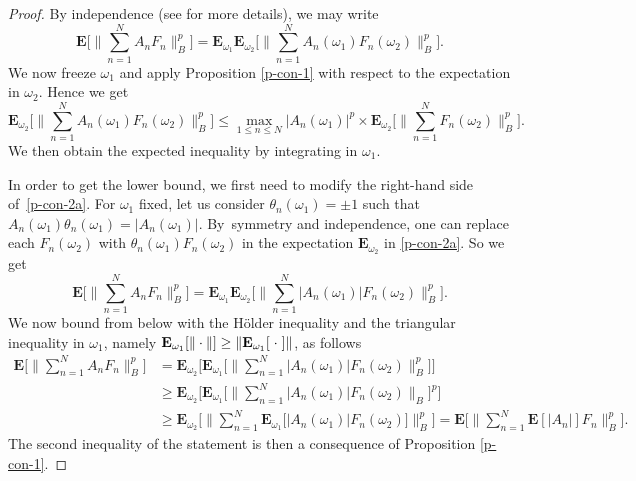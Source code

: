 \documentclass[JEP,XML,SOM,Unicode,NoEqCountersInSection,published]{cedram}
\theoremstyle{theorem}
\theoremstyle{definition}
\newcommand\E{\mathbf{E}}
\begin{document}
\begin{proof}
By independence (see \cite[App.\,F]{imek-aif} for more details), we may write
\begin{equation}\label{p-con-2a}
\E\biggl[\Big\| \sum_{n=1}^N A_n F_n \Big\|_{B}^p \biggr]=
\E_{\omega_1} \E_{\omega_2}\biggl[\Big\| \sum_{n=1}^N A_n(\omega_1) F_n(\omega_2) \Big\|_{B}^p \biggr].
\end{equation}
We now freeze $\omega_1$ and apply Proposition \ref{p-con-1} with respect to the expectation in $\omega_2$. Hence we get
\begin{equation*}
\E_{\omega_2}\biggl[\Big\| \sum_{n=1}^N A_n(\omega_1) F_n(\omega_2) \Big\|_{B}^p \biggr] \leq \max_{1\leq n\leq N} |A_n(\omega_1)|^p\times
\E_{\omega_2}\biggl[\Big\| \sum_{n=1}^N F_n(\omega_2) \Big\|_{B}^p \biggr].
\end{equation*}
We then obtain the expected inequality by integrating in $\omega_1$.

In order to get the lower bound, we first need to modify the right-hand side of~\eqref{p-con-2a}.
For $\omega_1$ fixed, let us consider $\theta_n(\omega_1)=\pm 1$ such that $A_n(\omega_1)\theta_n(\omega_1)=|A_n(\omega_1)|$.
By~\hbox{symmetry} and independence, one can replace each $F_n(\omega_2)$ with $\theta_n(\omega_1) F_n(\omega_2)$ in the expectation $\E_{\omega_2}$ in \eqref{p-con-2a}. So we get\vspace*{-3pt}
\begin{equation}\label{symsym}
\E\biggl[\Big\| \sum_{n=1}^N A_n F_n \Big\|_{B}^p \biggr]=
\E_{\omega_1} \E_{\omega_2}\biggl[\Big\| \sum_{n=1}^N |A_n(\omega_1)| F_n(\omega_2) \Big\|_{B}^p \biggr].
\end{equation}
We now bound from below with the Hölder inequality and the triangular inequality in $\omega_1$, namely $\E_{\omega_1}[\|\cdot\|]\geq \|\E_{\omega_1}[\hspace{1 mm}\cdot\hspace{1 mm}]\|$, as follows\vspace*{-3pt}
\begin{align*}
\E\biggl[\Big\| \sum_{n=1}^N A_n F_n \Big\|_{B}^p \biggr]&=
\E_{\omega_2}\biggl[\E_{\omega_1}\biggl[\Big\| \sum_{n=1}^N |A_n(\omega_1)| F_n(\omega_2) \Big\|_{B}^p \biggr]\biggr]\\[-3pt]
&\geq \E_{\omega_2}\biggl[\E_{\omega_1}\biggl[\Big\|\sum_{n=1}^N |A_n(\omega_1)|F_n(\omega_2) \Big\|_B \biggr]^p \biggr]\\[-3pt]
&\geq \E_{\omega_2}\biggl[\Big\|\sum_{n=1}^N \E_{\omega_1}\big[|A_n(\omega_1)|F_n(\omega_2) \big]\Big\|_B^p \biggr]=\E\biggl[\Big\|\sum_{n=1}^N \E[|A_n|]F_n \Big\|_B^p \biggr].
\end{align*}
The second inequality of the statement is then a consequence of Proposition \ref{p-con-1}.
\end{proof}
\end{document}
